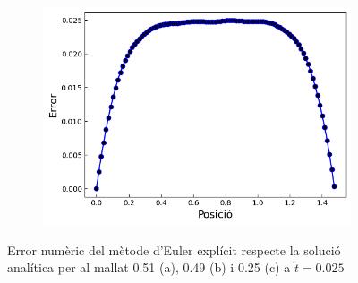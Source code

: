 \documentclass{article}
\begin{document}
\begin{figure}[h]
\begin{subfigure}[b]{0.32\textwidth}
        \includegraphics[width=\textwidth]{images/Error_vs_pos_at3.png}
        \caption{} 
        \label{fig:err_euler_exp_at3}
    \end{subfigure}
    \caption{Error numèric del mètode d'Euler explícit respecte la solució analítica per al mallat 0.51 (a), 0.49 (b) i 0.25 (c) a $\tilde{t}=0.025$}
    \label{fig:err_euler_explicit}
\end{figure}
\end{document}
